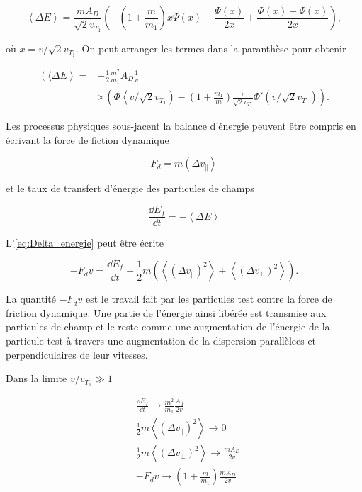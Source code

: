 \documentclass[main.tex]{subfiles}
\begin{document}
\[
	\left\langle \Delta E \right\rangle = \frac{m A_D}{\sqrt{2} v_{T_1}} \left( - \left( 1 + \frac{m}{m_1} \right) x \Psi\left(x \right) + \frac{\Psi \left( x \right)}{2x} + \frac{\Phi \left( x \right) - \Psi \left( x \right)}{2x} \right),
\]

\noindent où \( x = v / \sqrt{2} v_{T_1} \). On peut arranger les termes dans la paranthèse pour obtenir

\begin{align}
	\left(\langle \Delta E \right\rangle = &- \frac{1}{2} \frac{m^2}{m_1} A_D \frac{1}{v} \nonumber\\
	& \times \left( \Phi \left\langle v/\sqrt{2} v_{T_1} \right) - \left( 1 + \frac{m_1}{m} \right) \frac{v}{\sqrt{2}v_{T_1}} \Phi' \left( v / \sqrt{2} v_{T_1} \right) \right).
	\label{eq:Delta_energie_2}
\end{align}

\noindent Les processus physiques sous-jacent la balance d'énergie peuvent être compris en écrivant la force de fiction dynamique

\[
	F_d = m \left(\Delta v_\parallel \right\rangle
\]

\noindent et le taux de transfert d'énergie des particules de champs

\[
	\frac{\dd E_f}{\dd t} = - \left\langle \Delta E \right\rangle
\]

\noindent L'\autoref{eq:Delta_energie} peut être écrite

\[
	- F_d v = \frac{\dd E_f}{\dd t} + \frac{1}{2}m \left( \left\langle \left( \Delta v_\parallel \right)^2 \right\rangle + \left\langle \left( \Delta v_\perp \right)^2 \right\rangle \right).
\]

\noindent La quantité \( -F_d v \) est le travail fait par les particules test contre la force de friction dynamique.
Une partie de l'énergie ainsi libérée est transmise aux particules de champ et le reste comme une augmentation de l'énergie de la particule test à travers une augmentation de la dispersion parallèlees et perpendiculaires de leur vitesses.

Dans la limite \( v/v_{T_1} \gg 1 \)

\begin{align}
	&\frac{\dd E_f}{\dd t} \rightarrow \frac{m^2}{m_1} \frac{A_d}{2v} \nonumber\\
	&\frac{1}{2} m \left\langle \left( \Delta v_\parallel\right)^2 \right\rangle \rightarrow 0 \nonumber \\
	&\frac{1}{2} m \left\langle \left( \Delta v_\perp \right)^2 \right\rangle \rightarrow \frac{m A_D}{2 v} \label{eq:limite_Delta_v_perp}\\
	&- F_d v \rightarrow \left( 1 + \frac{m}{m_1} \right) \frac{m A_D}{2 v} \label{eq:limite_F_d}
\end{align}
\end{document}
